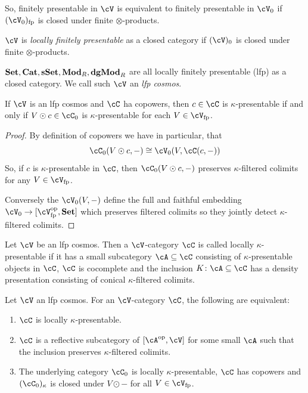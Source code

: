 \documentclass[a4paper,11pt,oneside,openany]{scrbook}
\begin{document}
So, finitely presentable in $ \cV $ is equivalent to finitely presentable in $ \cV_0 $ if $ (\cV_0)_{\text{fp}} $ is closed under finite $ \otimes $-products.

\begin{defn}
    $ \cV $ is \emph{locally finitely presentable} as a closed category if $ (\cV)_0 $ is closed under finite $ \otimes $-products.
\end{defn}

\begin{exmp}
    $ {\normalfont\textbf{Set}},{\normalfont\textbf{Cat}},{\normalfont\textbf{sSet}},{\normalfont\textbf{Mod}}_R,{\normalfont\textbf{dgMod}}_R $ are all locally finitely presentable (lfp) as a closed category. We call such $ \cV $ an \emph{lfp cosmos}.
\end{exmp}
\begin{prop}
    If $ \cV $ is an lfp cosmos and $ \cC $ ha copowers, then $ c\in \cC $ is $ \kappa $-presentable if and only if $ V\odot c \in \cC_0 $ is $ \kappa $-presentable for each $ V \in \cV_{\text{fp}} $.
\end{prop}
\begin{proof}
    By definition of copowers we have in particular, that
    \begin{displaymath}
	\cC_0(V \odot c , -) \iso \cV_0 (V , \cC(c,-))
    \end{displaymath}
    So, if $ c $ is $ \kappa $-presentable in $ \cC $, then $ \cC_0(V\odot c, -) $ preserves $ \kappa $-filtered colimits for any $ V \in \cV_{\text{fp}} $.
    
    Conversely the $ \cV_0(V,-) $ define the full and faithful embedding $ \cV_0 \to [\cV ^{\op} _{\text{fp}} , \Set ] $ which preserves filtered colimits so they jointly detect $ \kappa $-filtered colimits.
\end{proof}
\begin{defn}
    Let $ \cV $ be an lfp  cosmos. Then a $ \cV $-category $ \cC $ is called locally $ \kappa $-presentable if it has a small subcategory $ \cA \subseteq\cC  $ consisting of $ \kappa $-presentable objects in $ \cC $, $ \cC $ is cocomplete and the inclusion $ K \from \cA \subseteq\cC  $ has a density presentation consisting of conical $ \kappa $-filtered colimits.
\end{defn}
\begin{thm}
    Let $ \cV $ an lfp cosmos.
    For an $ \cV $-category $ \cC $, the following are equivalent:
    \begin{enumerate}[label=\arabic*)]
        \item
	    $ \cC $ is locally $ \kappa $-presentable.
	\item
	    $ \cC $ is a reflective subcategory of $ [\cA^{\op}, \cV] $ for some small $ \cA $ such that the inclusion preserves $ \kappa $-filtered colimits.\item
	    The underlying category $ \cC_0 $ is locally $ \kappa $-presentable, $ \cC  $ has copowers and $ (\cC_0)_{\kappa}  $ is closed under $ V\odot - $ for all $ V \in \cV_{\text{fp}} $.
    \end{enumerate}
\end{thm}
\end{document}
